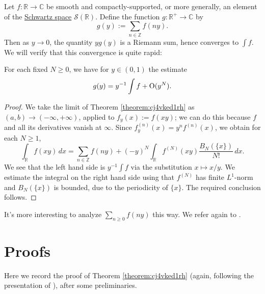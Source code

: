 \documentclass[reqno]{amsart} 
\begin{document}
Let $f : \mathbb{R} \rightarrow \mathbb{C}$ be smooth and compactly-supported, or more generally, an element of the \href{https://en.wikipedia.org/wiki/Schwartz_space}{Schwartz space} $\mathcal{S}(\mathbb{R})$.  Define the function $g : \mathbb{R}^+ \rightarrow \mathbb{C}$ by
\begin{equation*}
g(y) := \sum_{n \in \mathbb{Z} } f (n y ).
\end{equation*}
Then as $y \rightarrow 0$, the quantity $y g(y)$ is a Riemann sum, hence converges to $\int f$.  We will verify that this convergence is quite rapid:
\begin{lemma}
  For each fixed $N \geq 0$, we have for $y \in (0,1)$ the estimate
  \begin{equation*}
g(y) = y^{-1}  \int f + \operatorname{O}(y^N).
  \end{equation*}
\end{lemma}
\begin{proof}
  We take the limit of Theorem \ref{theorem:cj4vked1rh} as $(a,b) \rightarrow (-\infty, +\infty)$, applied to $f_y(x) := f(x y)$; we can do this because $f$ and all its derivatives vanish at $\infty$.  Since $f_y^{(n)}(x) = y^n f^{(n)}(x)$, we obtain for each $N \geq 1$,
  \begin{equation*}
\int_{\mathbb{R} } f (x y ) \, d x = \sum_{n \in \mathbb{Z} } f (n y) + (- y)^N \int_{\mathbb{R} } f^{(N)} (x y) \frac{B_N (\{x\})}{N!} \, d x.
  \end{equation*}
  We see that the left hand side is $y^{-1} \int f$ via the substitution $x \mapsto x/y$.  We estimate the integral on the right hand side using that $f^{(N)}$ has finite $L^1$-norm and $B_N (\{x\})$ is bounded, due to the periodicity of $\{x\}$.  The required conclusion follows.
\end{proof}

\begin{remark}
It's more interesting to analyze $\sum_{n \geq 0 } f(n y)$ this way.  We refer again to \cite[\S4]{zagier-mellin}.
\end{remark}


\section{Proofs}\label{sec:cj4vkej9k1}

Here we record the proof of Theorem \ref{theorem:cj4vked1rh} (again, following the presentation of \cite[\S4]{zagier-mellin}), after some preliminaries.
\end{document}
